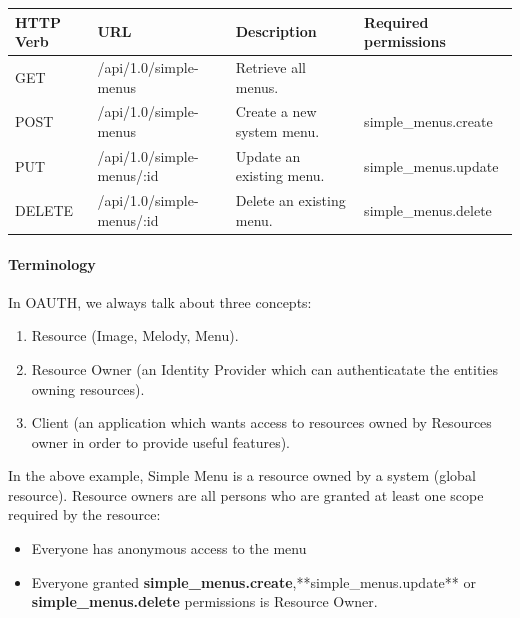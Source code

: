 \documentclass[letterpaper,10pt,english]{sphinxmanual}
\begin{document}
\begin{tabulary}{\linewidth}{|L|L|L|L|}
\hline

\textbf{HTTP Verb}
 & 
\textbf{URL}
 & 
\textbf{Description}
 & 
\textbf{Required permissions}
\\\hline

GET
 & 
/api/1.0/simple-menus
 & 
Retrieve all menus.
 & \\\hline

POST
 & 
/api/1.0/simple-menus
 & 
Create a new system menu.
 & 
simple\_menus.create
\\\hline

PUT
 & 
/api/1.0/simple-menus/:id
 & 
Update an existing menu.
 & 
simple\_menus.update
\\\hline

DELETE
 & 
/api/1.0/simple-menus/:id
 & 
Delete an existing menu.
 & 
simple\_menus.delete
\\\hline
\end{tabulary}



\paragraph{Terminology}
\label{features/oauth2/simple_api_example:terminology}
In OAUTH, we always talk about three concepts:
\begin{enumerate}
\item {} 
Resource (Image, Melody, Menu).

\item {} 
Resource Owner (an Identity Provider which can authenticatate the entities owning resources).

\item {} 
Client (an application which wants access to resources owned by Resources owner in order to provide useful features).

\end{enumerate}

In the above example, Simple Menu is a resource owned by a system (global resource). Resource owners are all persons who
are granted at least one scope required by the resource:
\begin{itemize}
\item {} 
Everyone has anonymous access to the menu

\item {} 
Everyone granted \textbf{simple\_menus.create},**simple\_menus.update** or \textbf{simple\_menus.delete} permissions is Resource Owner.

\end{itemize}
\end{document}
